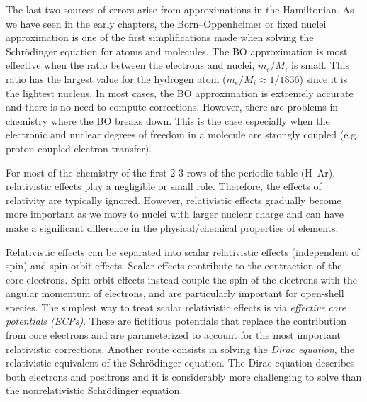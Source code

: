\documentclass[../Main/notes.tex]{subfiles}
\begin{document}
The last two sources of errors arise from approximations in the Hamiltonian.
As we have seen in the early chapters, the Born--Oppenheimer or fixed nuclei approximation is one of the first simplifications made when solving the Schr\"{o}dinger equation for atoms and molecules.
The BO approximation is most effective when the ratio between the electrons and nuclei, $m_e / M_i$ is small.
This ratio has the largest value for the hydrogen atom ($m_e / M_i \approx 1/1836$) since it is the lightest nucleus.
In most cases, the BO approximation is extremely accurate and there is no need to compute corrections.
However, there are problems in chemistry where the BO breaks down.
This is the case especially when the electronic and nuclear degrees of freedom in a molecule are strongly coupled (e.g. proton-coupled electron transfer).

For most of the chemistry of the first 2-3 rows of the periodic table (H--Ar), relativistic effects play a negligible or small role.
Therefore, the effects of relativity are typically ignored.
However, relativistic effects gradually become more important as we move to nuclei with larger nuclear charge and can have make a significant difference in the physical/chemical properties of elements.

Relativistic effects can be separated into scalar relativistic effects (independent of spin) and spin-orbit effects.
Scalar effects contribute to the contraction of the core electrons.
Spin-orbit effects instead couple the spin of the electrons with the angular momentum of electrons, and are particularly important for open-shell species.
The simplest way to treat scalar relativistic effects is via \emph{effective core potentials (ECPs)}.
These are fictitious potentials that replace the contribution from core electrons and are parameterized to account for the most important relativistic corrections.
Another route consists in solving the \emph{Dirac equation}, the relativistic equivalent of the Schr\"{o}dinger equation.
The Dirac equation describes both electrons and positrons and it is considerably more challenging to solve than the nonrelativistic Schr\"{o}dinger equation.
\end{document}
